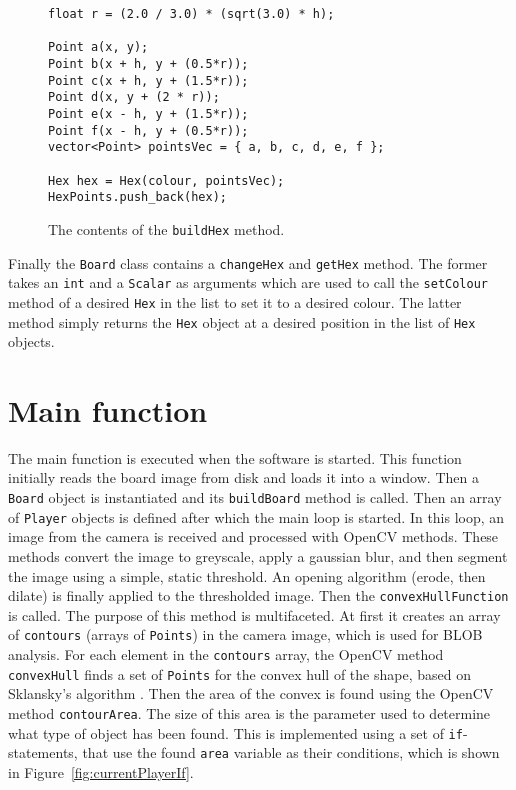 \begin{figure}[!h]
\begin{lstlisting}
float r = (2.0 / 3.0) * (sqrt(3.0) * h);

Point a(x, y);
Point b(x + h, y + (0.5*r));
Point c(x + h, y + (1.5*r));
Point d(x, y + (2 * r));
Point e(x - h, y + (1.5*r));
Point f(x - h, y + (0.5*r));
vector<Point> pointsVec = { a, b, c, d, e, f };

Hex hex = Hex(colour, pointsVec);
HexPoints.push_back(hex);
\end{lstlisting}
\caption{The contents of the \texttt{buildHex} method. \label{fig:buildHexMethod}}
\end{figure}

Finally the \texttt{Board} class contains a \texttt{changeHex} and \texttt{getHex} method. The former takes an \texttt{int} and a \texttt{Scalar} as arguments which are used to call the \texttt{setColour} method of a desired \texttt{Hex} in the list to set it to a desired colour. The latter method simply returns the \texttt{Hex} object at a desired position in the list of \texttt{Hex} objects.

\section{Main function}
The main function is executed when the software is started. This function initially reads the board image from disk and loads it into a window. Then a \texttt{Board} object is instantiated and its \texttt{buildBoard} method is called. Then an array of \texttt{Player} objects is defined after which the main loop is started. In this loop, an image from the camera is received and processed with OpenCV methods. These methods convert the image to greyscale, apply a gaussian blur, and then segment the image using a simple, static threshold. An opening algorithm (erode, then dilate) is finally applied to the thresholded image. Then the \texttt{convexHullFunction} is called. The purpose of this method is multifaceted. At first it creates an array of \texttt{contours} (arrays of \texttt{Points}) in the camera image, which is used for BLOB analysis. For each element in the \texttt{contours} array, the OpenCV method \texttt{convexHull} finds a set of \texttt{Points} for the convex hull of the shape, based on Sklansky's algorithm \citep{Sklansky198279}. Then the area of the convex is found using the OpenCV method \texttt{contourArea}. The size of this area is the parameter used to determine what type of object has been found. This is implemented using a set of \texttt{if}-statements, that use the found \texttt{area} variable as their conditions, which is shown in Figure~\ref{fig:currentPlayerIf}.

